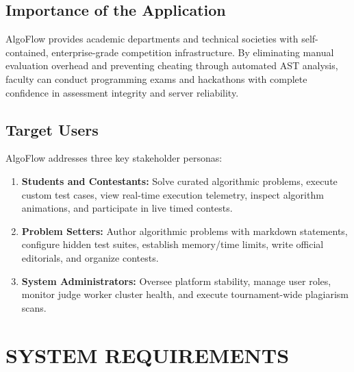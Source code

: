 \documentclass[12pt,a4paper]{report}
\begin{document}
\section{Importance of the Application}
AlgoFlow provides academic departments and technical societies with self-contained, enterprise-grade competition infrastructure. By eliminating manual evaluation overhead and preventing cheating through automated AST analysis, faculty can conduct programming exams and hackathons with complete confidence in assessment integrity and server reliability.

\section{Target Users}
AlgoFlow addresses three key stakeholder personas:
\begin{enumerate}[leftmargin=*, label=\bfseries\arabic*.]
  \item \textbf{Students and Contestants:} Solve curated algorithmic problems, execute custom test cases, view real-time execution telemetry, inspect algorithm animations, and participate in live timed contests.
  \item \textbf{Problem Setters:} Author algorithmic problems with markdown statements, configure hidden test suites, establish memory/time limits, write official editorials, and organize contests.
  \item \textbf{System Administrators:} Oversee platform stability, manage user roles, monitor judge worker cluster health, and execute tournament-wide plagiarism scans.
\end{enumerate}

\clearpage

\chapter{SYSTEM REQUIREMENTS}
\end{document}
